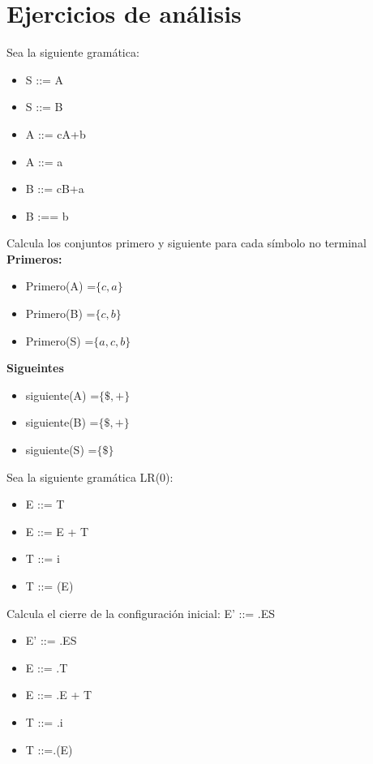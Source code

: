 \section{Ejercicios de análisis}

\begin{problem}
Sea la siguiente gramática:
\begin{itemize}
\item S ::= A
\item S ::= B
\item A ::= cA+b
\item A ::= a
\item B ::= cB+a
\item B :== b
\end{itemize}
 Calcula los conjuntos primero y siguiente para cada símbolo no terminal
\solution
\textbf{Primeros:}

\begin{itemize}
\item Primero(A) =$\{c,a\}$
\item Primero(B) =$\{c,b\}$
\item Primero(S) =$\{a,c,b\}$
\end{itemize}

\textbf{Sigueintes}

\begin{itemize}
\item siguiente(A) =$\{\$,+\}$
\item siguiente(B) =$\{\$, +\}$
\item siguiente(S) =$\{\$\}$
\end{itemize}
\end{problem}

\begin{problem}
Sea la siguiente gramática LR(0):
\begin{itemize}
\item E ::= T
\item E ::= E + T
\item T ::= i
\item T ::= (E)
\end{itemize}
Calcula el cierre de la configuración inicial: E' ::= .ES
\solution
\begin{itemize}
\item E' ::= .ES
\item E ::= .T
\item E ::= .E + T
\item T ::= .i
\item T ::=.(E)
\end{itemize}
\end{problem}

